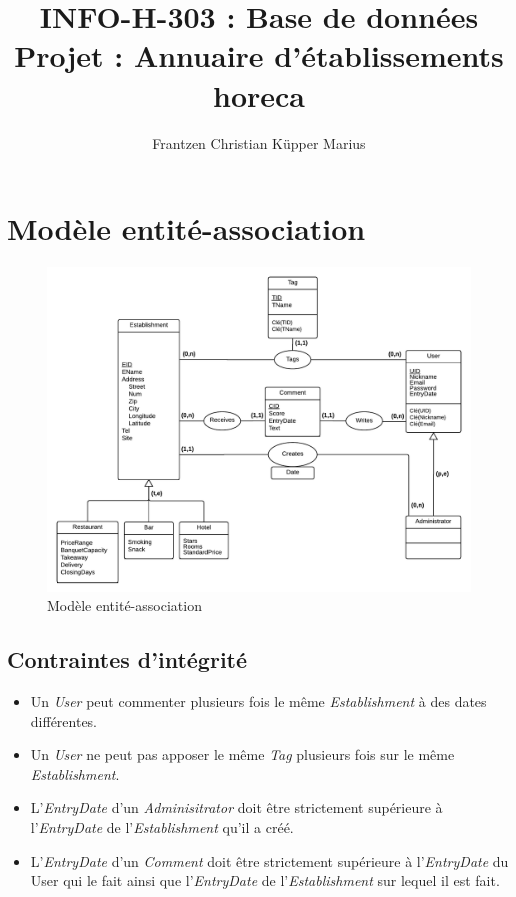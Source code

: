 \documentclass[11pt,a4paper]{report}
\author{Frantzen Christian Küpper Marius}
\title{INFO-H-303 : Base de données\\
		Projet : Annuaire d'établissements horeca}
\begin{document}
\maketitle
\section*{Modèle entité-association}

\begin{figure}[h]
  \centering
  \includegraphics[width=\textwidth]{modelEA.pdf}
  \caption{Modèle entité-association}
\end{figure}


\subsection*{Contraintes d'intégrité}

\begin{itemize}
\item Un \textit{User} peut commenter plusieurs fois le même \textit{Establishment} à des dates différentes. 
\item Un \textit{User} ne peut pas apposer le même \textit{Tag} plusieurs fois sur le même \textit{Establishment}.
\item L'\textit{EntryDate} d'un \textit{Adminisitrator} doit être strictement supérieure à l'\textit{EntryDate} de l'\textit{Establishment} qu'il a créé.
\item L'\textit{EntryDate} d'un \textit{Comment} doit être strictement supérieure à l'\textit{EntryDate} du User qui le fait ainsi que l'\textit{EntryDate} de l'\textit{Establishment} sur lequel il est fait. 
\end{itemize}
\end{document}
